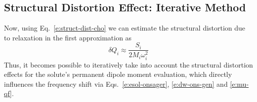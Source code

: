 \documentclass[a4paper,titlepage,twoside,fleqn,12pt]{book}
\begin{document}
\begin{refsection}
\subsection{Structural Distortion Effect: Iterative Method}

Now, using Eq.~\eqref{e:struct-dist-cho}
we can estimate the structural distortion due to relaxation 
in the first approximation as
%
\begin{equation} \label{e:ons-dq-init}
\delta Q_i \approx \frac{S_i}{2M_i\omega_i^2}
\end{equation}
%
Thus, it becomes possible to iteratively take into account 
the structural distortion effects for the solute's permanent
dipole moment evaluation, which directly influences the 
frequency shift via Eqs.~\eqref{e:esol-onsager}, 
\eqref{e:dw-ons-gen} and \eqref{e:mu-qf}.


\end{refsection}
\end{document}
